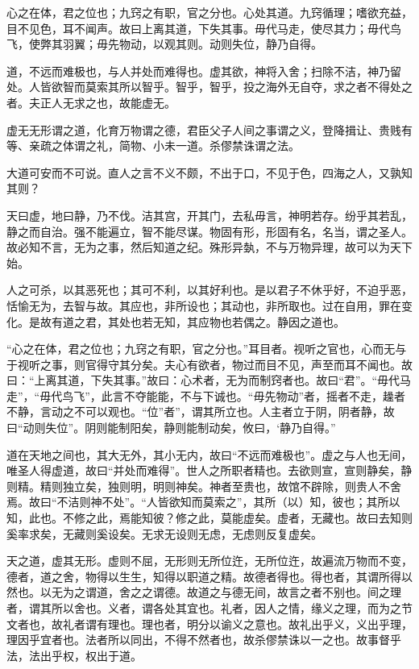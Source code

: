心之在体，君之位也；九窍之有职，官之分也。心处其道。九窍循理；嗜欲充益，目不见色，耳不闻声。故曰上离其道，下失其事。毋代马走，使尽其力；毋代鸟飞，使弊其羽翼；毋先物动，以观其则。动则失位，静乃自得。

道，不远而难极也，与人并处而难得也。虚其欲，神将入舍；扫除不洁，神乃留处。人皆欲智而莫索其所以智乎。智乎，智乎，投之海外无自夺，求之者不得处之者。夫正人无求之也，故能虚无。

虚无无形谓之道，化育万物谓之德，君臣父子人间之事谓之义，登降揖让、贵贱有等、亲疏之体谓之礼，简物、小未一道。杀僇禁诛谓之法。

大道可安而不可说。直人之言不义不颇，不出于口，不见于色，四海之人，又孰知其则？

天曰虚，地曰静，乃不伐。洁其宫，开其门，去私毋言，神明若存。纷乎其若乱，静之而自治。强不能遍立，智不能尽谋。物固有形，形固有名，名当，谓之圣人。故必知不言，无为之事，然后知道之纪。殊形异埶，不与万物异理，故可以为天下始。

人之可杀，以其恶死也；其可不利，以其好利也。是以君子不休乎好，不迫乎恶，恬愉无为，去智与故。其应也，非所设也；其动也，非所取也。过在自用，罪在变化。是故有道之君，其处也若无知，其应物也若偶之。静因之道也。

“心之在体，君之位也；九窍之有职，官之分也。”耳目者。视听之官也，心而无与于视听之事，则官得守其分矣。夫心有欲者，物过而目不见，声至而耳不闻也。故曰：“上离其道，下失其事。”故曰：心术者，无为而制窍者也。故曰“君”。“毋代马走”，“毋代鸟飞”，此言不夺能能，不与下诚也。“毋先物动”者，摇者不走，趮者不静，言动之不可以观也。“位”者”，谓其所立也。人主者立于阴，阴者静，故曰“动则失位”。阴则能制阳矣，静则能制动矣，攸曰，‘静乃自得。”

道在天地之间也，其大无外，其小无内，故曰“不远而难极也”。虚之与人也无间，唯圣人得虚道，故曰“并处而难得”。世人之所职者精也。去欲则宣，宣则静矣，静则精。精则独立矣，独则明，明则神矣。神者至贵也，故馆不辟除，则贵人不舍焉。故曰“不洁则神不处”。“人皆欲知而莫索之”，其所（以）知，彼也；其所以知，此也。不修之此，焉能知彼？修之此，莫能虚矣。虚者，无藏也。故曰去知则奚率求矣，无藏则奚设矣。无求无设则无虑，无虑则反复虚矣。

天之道，虚其无形。虚则不屈，无形则无所位迕，无所位迕，故遍流万物而不变，德者，道之舍，物得以生生，知得以职道之精。故德者得也。得也者，其谓所得以然也。以无为之谓道，舍之之谓德。故道之与德无间，故言之者不别也。间之理者，谓其所以舍也。义者，谓各处其宜也。礼者，因人之情，缘义之理，而为之节文者也，故礼者谓有理也。理也者，明分以谕义之意也。故礼出乎义，义出乎理，理因乎宜者也。法者所以同出，不得不然者也，故杀僇禁诛以一之也。故事督乎法，法出乎权，权出于道。

